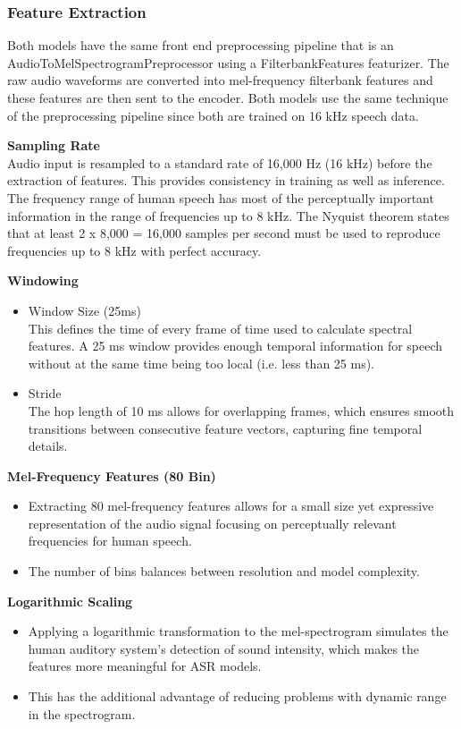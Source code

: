 \subsubsection{Feature Extraction}
Both models have the same front end preprocessing pipeline that is an AudioToMelSpectrogramPreprocessor using a FilterbankFeatures featurizer. The raw audio waveforms are converted into mel-frequency filterbank features and these features are then sent to the encoder. Both models use the same technique of the preprocessing pipeline since both are trained on 16 kHz speech data.

\textbf{Sampling Rate}\\
Audio input is resampled to a standard rate of 16,000 Hz (16 kHz) before the extraction of features. This provides consistency in training as well as inference. The frequency range of human speech has most of the perceptually important information in the range of frequencies up to 8 kHz. The Nyquist theorem states that at least 2 x 8,000 = 16,000 samples per second must be used to reproduce frequencies up to 8 kHz with perfect accuracy. 

\textbf{Windowing}
\begin{itemize}
    \item Window Size (25ms)\\
    This defines the time of every frame of time used to calculate spectral features. A 25 ms window provides enough temporal information for speech without at the same time being too local (i.e. less than 25 ms).
    \item Stride \\
    The hop length of 10 ms allows for overlapping frames, which ensures smooth transitions between consecutive feature vectors, capturing fine temporal details.
\end{itemize}

\textbf{Mel-Frequency Features (80 Bin)}
\begin{itemize}
    \item Extracting 80 mel-frequency features allows for a small size yet expressive representation of the audio signal focusing on perceptually relevant frequencies for human speech.
    \item The number of bins balances between resolution and model complexity.
\end{itemize}

\textbf{Logarithmic Scaling}
\begin{itemize}
    \item Applying a logarithmic transformation to the mel-spectrogram simulates the human auditory system's detection of sound intensity, which makes the features more meaningful for ASR models.
    \item This has the additional advantage of reducing problems with dynamic range in the spectrogram.
\end{itemize}

